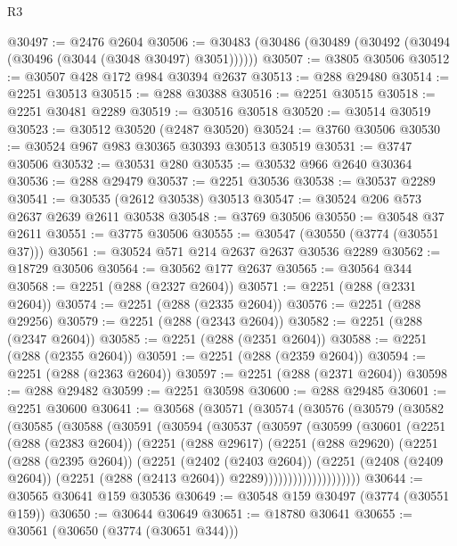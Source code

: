 \begin{lexlean}{R3}
\begin{coremodule}
@30497 := @2476 @2604
@30506 := @30483 (@30486 (@30489 (@30492 (@30494 (@30496 (@3044 (@3048 @30497) @3051))))))
@30507 := @3805 @30506
@30512 := @30507 @428 @172 @984 @30394 @2637
@30513 := @288 @29480
@30514 := @2251 @30513
@30515 := @288 @30388
@30516 := @2251 @30515
@30518 := @2251 @30481 @2289
@30519 := @30516 @30518
@30520 := @30514 @30519
@30523 := @30512 @30520 (@2487 @30520)
@30524 := @3760 @30506
@30530 := @30524 @967 @983 @30365 @30393 @30513 @30519
@30531 := @3747 @30506
@30532 := @30531 @280
@30535 := @30532 @966 @2640 @30364
@30536 := @288 @29479
@30537 := @2251 @30536
@30538 := @30537 @2289
@30541 := @30535 (@2612 @30538) @30513
@30547 := @30524 @206 @573 @2637 @2639 @2611 @30538
@30548 := @3769 @30506
@30550 := @30548 @37 @2611
@30551 := @3775 @30506
@30555 := @30547 (@30550 (@3774 (@30551 @37)))
@30561 := @30524 @571 @214 @2637 @2637 @30536 @2289
@30562 := @18729 @30506
@30564 := @30562 @177 @2637
@30565 := @30564 @344
@30568 := @2251 (@288 (@2327 @2604))
@30571 := @2251 (@288 (@2331 @2604))
@30574 := @2251 (@288 (@2335 @2604))
@30576 := @2251 (@288 @29256)
@30579 := @2251 (@288 (@2343 @2604))
@30582 := @2251 (@288 (@2347 @2604))
@30585 := @2251 (@288 (@2351 @2604))
@30588 := @2251 (@288 (@2355 @2604))
@30591 := @2251 (@288 (@2359 @2604))
@30594 := @2251 (@288 (@2363 @2604))
@30597 := @2251 (@288 (@2371 @2604))
@30598 := @288 @29482
@30599 := @2251 @30598
@30600 := @288 @29485
@30601 := @2251 @30600
@30641 := @30568
    (@30571
      (@30574
        (@30576
          (@30579
            (@30582
              (@30585
                (@30588
                  (@30591
                    (@30594
                      (@30537
                        (@30597
                          (@30599
                            (@30601
                              (@2251
                                (@288 (@2383 @2604))
                                (@2251
                                  (@288 @29617)
                                  (@2251
                                    (@288 @29620)
                                    (@2251
                                      (@288 (@2395 @2604))
                                      (@2251
                                        (@2402 (@2403 @2604))
                                        (@2251
                                          (@2408 (@2409 @2604))
                                          (@2251 (@288 (@2413 @2604)) @2289))))))))))))))))))))
@30644 := @30565 @30641 @159 @30536
@30649 := @30548 @159 @30497 (@3774 (@30551 @159))
@30650 := @30644 @30649
@30651 := @18780 @30641
@30655 := @30561 (@30650 (@3774 (@30651 @344)))

\end{coremodule}
\end{lexlean}
